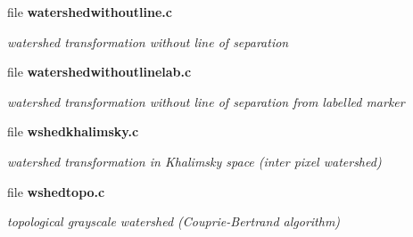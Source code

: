 \begin{CompactItemize}
\item 
file \bf{watershedwithoutline.c}
\begin{CompactList}\small\item\em watershed transformation without line of separation \item\end{CompactList}

\item 
file \bf{watershedwithoutlinelab.c}
\begin{CompactList}\small\item\em watershed transformation without line of separation from labelled marker \item\end{CompactList}

\item 
file \bf{wshedkhalimsky.c}
\begin{CompactList}\small\item\em watershed transformation in Khalimsky space (inter pixel watershed) \item\end{CompactList}

\item 
file \bf{wshedtopo.c}
\begin{CompactList}\small\item\em topological grayscale watershed (Couprie-Bertrand algorithm) \item\end{CompactList}

\end{CompactItemize}
